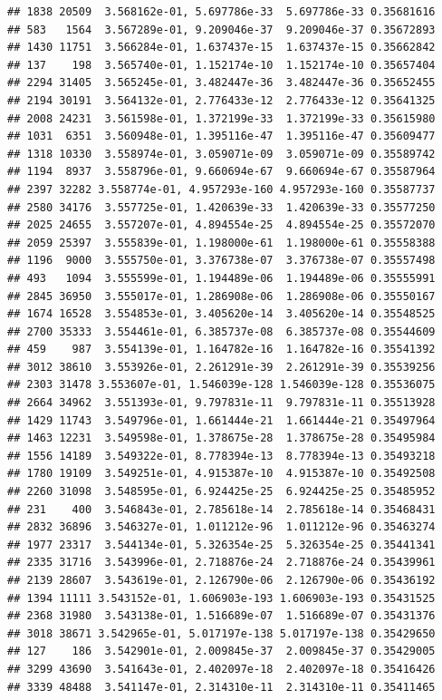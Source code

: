 \documentclass[
]{article}
\begin{document}
\begin{verbatim}
## 1838 20509  3.568162e-01, 5.697786e-33  5.697786e-33 0.35681616
## 583   1564  3.567289e-01, 9.209046e-37  9.209046e-37 0.35672893
## 1430 11751  3.566284e-01, 1.637437e-15  1.637437e-15 0.35662842
## 137    198  3.565740e-01, 1.152174e-10  1.152174e-10 0.35657404
## 2294 31405  3.565245e-01, 3.482447e-36  3.482447e-36 0.35652455
## 2194 30191  3.564132e-01, 2.776433e-12  2.776433e-12 0.35641325
## 2008 24231  3.561598e-01, 1.372199e-33  1.372199e-33 0.35615980
## 1031  6351  3.560948e-01, 1.395116e-47  1.395116e-47 0.35609477
## 1318 10330  3.558974e-01, 3.059071e-09  3.059071e-09 0.35589742
## 1194  8937  3.558796e-01, 9.660694e-67  9.660694e-67 0.35587964
## 2397 32282 3.558774e-01, 4.957293e-160 4.957293e-160 0.35587737
## 2580 34176  3.557725e-01, 1.420639e-33  1.420639e-33 0.35577250
## 2025 24655  3.557207e-01, 4.894554e-25  4.894554e-25 0.35572070
## 2059 25397  3.555839e-01, 1.198000e-61  1.198000e-61 0.35558388
## 1196  9000  3.555750e-01, 3.376738e-07  3.376738e-07 0.35557498
## 493   1094  3.555599e-01, 1.194489e-06  1.194489e-06 0.35555991
## 2845 36950  3.555017e-01, 1.286908e-06  1.286908e-06 0.35550167
## 1674 16528  3.554853e-01, 3.405620e-14  3.405620e-14 0.35548525
## 2700 35333  3.554461e-01, 6.385737e-08  6.385737e-08 0.35544609
## 459    987  3.554139e-01, 1.164782e-16  1.164782e-16 0.35541392
## 3012 38610  3.553926e-01, 2.261291e-39  2.261291e-39 0.35539256
## 2303 31478 3.553607e-01, 1.546039e-128 1.546039e-128 0.35536075
## 2664 34962  3.551393e-01, 9.797831e-11  9.797831e-11 0.35513928
## 1429 11743  3.549796e-01, 1.661444e-21  1.661444e-21 0.35497964
## 1463 12231  3.549598e-01, 1.378675e-28  1.378675e-28 0.35495984
## 1556 14189  3.549322e-01, 8.778394e-13  8.778394e-13 0.35493218
## 1780 19109  3.549251e-01, 4.915387e-10  4.915387e-10 0.35492508
## 2260 31098  3.548595e-01, 6.924425e-25  6.924425e-25 0.35485952
## 231    400  3.546843e-01, 2.785618e-14  2.785618e-14 0.35468431
## 2832 36896  3.546327e-01, 1.011212e-96  1.011212e-96 0.35463274
## 1977 23317  3.544134e-01, 5.326354e-25  5.326354e-25 0.35441341
## 2335 31716  3.543996e-01, 2.718876e-24  2.718876e-24 0.35439961
## 2139 28607  3.543619e-01, 2.126790e-06  2.126790e-06 0.35436192
## 1394 11111 3.543152e-01, 1.606903e-193 1.606903e-193 0.35431525
## 2368 31980  3.543138e-01, 1.516689e-07  1.516689e-07 0.35431376
## 3018 38671 3.542965e-01, 5.017197e-138 5.017197e-138 0.35429650
## 127    186  3.542901e-01, 2.009845e-37  2.009845e-37 0.35429005
## 3299 43690  3.541643e-01, 2.402097e-18  2.402097e-18 0.35416426
## 3339 48488  3.541147e-01, 2.314310e-11  2.314310e-11 0.35411465

\end{verbatim}
\end{document}
